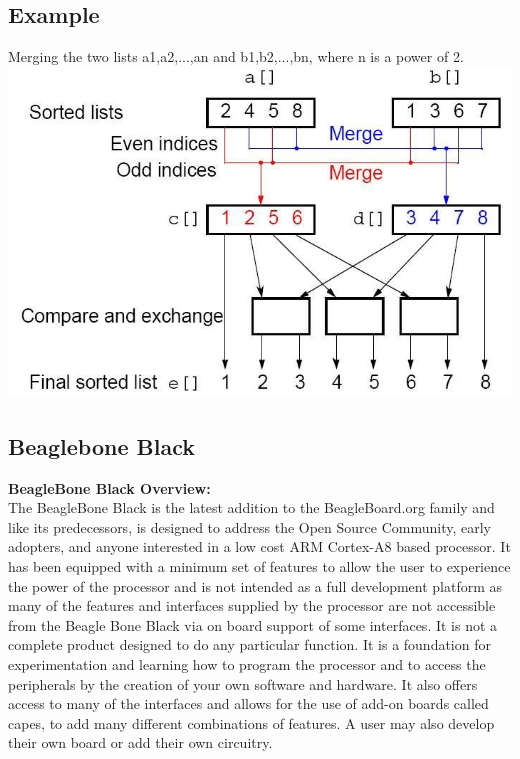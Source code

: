 \documentclass[10pt,a4paper]{article}
\begin{document}
	\subsection{Example}
	Merging the two lists a1,a2,...,an and b1,b2,...,bn, where n is a power of 2. 
	\includegraphics[width=\textwidth]{oddeven_example}
		
	\subsection{Beaglebone Black}
	\textbf{BeagleBone Black Overview:}\\ 
	The BeagleBone Black is the latest addition to the BeagleBoard.org family and like its predecessors, is designed to address the Open Source Community, early adopters, and anyone interested in a low cost ARM Cortex-A8 based processor. It has been equipped with a minimum set of features to allow the user to experience the power of the processor and is not intended as a full development platform as many of the features and interfaces supplied by the processor are not accessible from the Beagle Bone Black via on board support of some interfaces. It is not a complete product designed to do any particular function. It is a foundation for experimentation and learning how to program the processor and to access the peripherals by the creation of your own software and hardware. It also offers access to many of the interfaces and allows for the use of add-on boards called capes, to add many different combinations of features. A user may also develop their own board or add their own circuitry.
	
\end{document}

